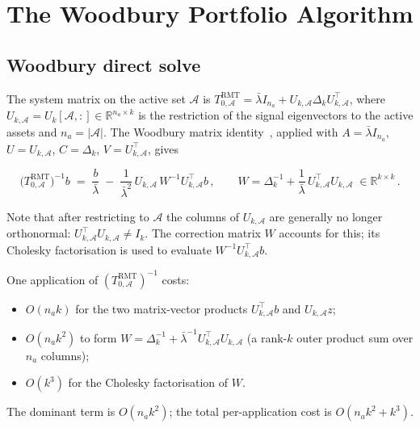 \section{The Woodbury Portfolio Algorithm}\label{sec:algorithm}

\subsection{Woodbury direct solve}

The system matrix on the active set $\mathcal{A}$ is
$T_{0,\mathcal{A}}^{\mathrm{RMT}} = \bar\lambda I_{n_a} + U_{k,\mathcal{A}}\Delta_k U_{k,\mathcal{A}}^\top$,
where $U_{k,\mathcal{A}} = U_k[\mathcal{A},:] \in \mathbb{R}^{n_a \times k}$ is the restriction
of the signal eigenvectors to the active assets and $n_a = |\mathcal{A}|$.
The Woodbury matrix identity~\cite{golub2013}, applied with
$A = \bar\lambda I_{n_a}$, $U = U_{k,\mathcal{A}}$, $C = \Delta_k$,
$V = U_{k,\mathcal{A}}^\top$, gives

\[
  \bigl(T_{0,\mathcal{A}}^{\mathrm{RMT}}\bigr)^{-1}\!b
  \;=\;
  \frac{b}{\bar\lambda}
  \;-\;
  \frac{1}{\bar\lambda^2}\,
  U_{k,\mathcal{A}}\,
  W^{-1}
  U_{k,\mathcal{A}}^\top b\,,
  \qquad
  W = \Delta_k^{-1} + \frac{1}{\bar\lambda}\,U_{k,\mathcal{A}}^\top U_{k,\mathcal{A}}
  \;\in \mathbb{R}^{k \times k}\,.
\]

Note that after restricting to $\mathcal{A}$ the columns of $U_{k,\mathcal{A}}$
are generally no longer orthonormal: $U_{k,\mathcal{A}}^\top U_{k,\mathcal{A}} \neq I_k$.
The correction matrix $W$ accounts for this; its Cholesky factorisation is used
to evaluate $W^{-1}U_{k,\mathcal{A}}^\top b$.

\begin{proposition}\label{prop:woodbury_cost}
One application of $(T_{0,\mathcal{A}}^{\mathrm{RMT}})^{-1}$ costs:
\begin{itemize}
  \item $O(n_a k)$ for the two matrix-vector products $U_{k,\mathcal{A}}^\top b$
        and $U_{k,\mathcal{A}} z$;
  \item $O(n_a k^2)$ to form $W = \Delta_k^{-1} + \bar\lambda^{-1} U_{k,\mathcal{A}}^\top U_{k,\mathcal{A}}$
        (a rank-$k$ outer product sum over $n_a$ columns);
  \item $O(k^3)$ for the Cholesky factorisation of $W$.
\end{itemize}
The dominant term is $O(n_a k^2)$; the total per-application cost is $O(n_a k^2 + k^3)$.
\end{proposition}

